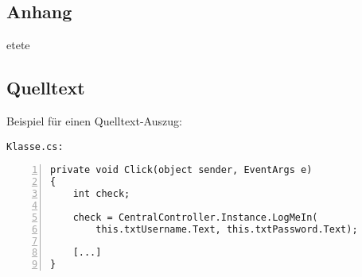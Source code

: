 \begin{appendices}
\renewcommand{\appendixname}{ANHANG}
\renewcommand{\appendixtocname}{\appendixname} 
\addappheadtotoc 


\part*{Anhang}

% 
etete

\chapter*{Quelltext}

Beispiel für einen Quelltext-Auszug:

\texttt{Klasse.cs:}
\begin{lstlisting}[basicstyle=\ttfamily,numbers=left,numberstyle=\footnotesize\ttfamily,backgroundcolor=\color{sourcegray}]
private void Click(object sender, EventArgs e)
{
    int check;
        
    check = CentralController.Instance.LogMeIn(
        this.txtUsername.Text, this.txtPassword.Text);
    
    [...]	
}
\end{lstlisting}

\end{appendices}
